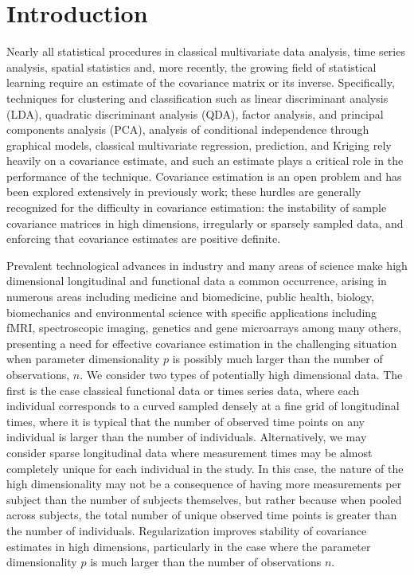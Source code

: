 \chapter{Introduction}
\label{intro.v2}


Nearly all statistical procedures in classical multivariate data analysis, time series analysis, spatial statistics and, more recently, the growing field of statistical learning require an estimate of the covariance matrix or its inverse. Specifically, techniques for clustering and classification such as linear discriminant analysis (LDA), quadratic discriminant analysis (QDA), factor analysis, and principal components analysis (PCA), analysis of conditional independence through graphical models, classical multivariate regression, prediction, and Kriging rely heavily on a covariance estimate, and such an estimate plays a critical role in the performance of the technique. Covariance estimation is an open problem and has been explored extensively in previously work; these hurdles are generally recognized for the difficulty in covariance estimation: the instability of sample covariance matrices in high dimensions, irregularly or sparsely sampled data, and enforcing that covariance estimates are positive definite.



Prevalent technological advances in industry and many areas of science make high dimensional longitudinal and functional data a common occurrence, arising in numerous areas including medicine and biomedicine, public health, biology, biomechanics and environmental science with specific applications including fMRI, spectroscopic imaging, genetics and gene microarrays among many others, presenting a need for effective covariance estimation in the challenging situation when parameter dimensionality $p$ is possibly much larger than the number of observations, $n$. We consider two types of potentially high dimensional data. The first is the case classical functional data or times series data, where each individual corresponds to a curved sampled densely at a fine grid of longitudinal times, where it is typical that the number of observed time points on any individual is larger than the number of individuals. Alternatively, we may consider sparse longitudinal data where measurement times may be almost completely unique for each individual in the study. In this case, the nature of the high dimensionality may not be a consequence of having more measurements per subject than the number of subjects themselves, but rather because when pooled across subjects, the total number of unique observed time points is greater than the number of individuals. Regularization improves stability of covariance estimates in high dimensions, particularly in the case where the parameter dimensionality $p$ is much larger than the number of observations $n$. 
	
